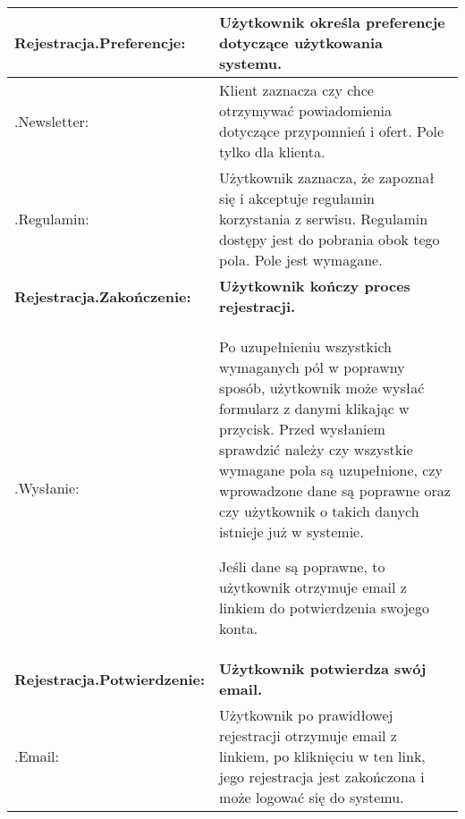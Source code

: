 \documentclass[a4paper,20pt]{article}
\begin{document}
\begin{itemize}
\begin{center}
\begin{tabularx}{\textwidth}[H]{XX}
\arrayrulecolor{black}\hline
\textbf{Rejestracja.Preferencje:} & \textbf{Użytkownik określa preferencje dotyczące użytkowania systemu.} \\
\hline

\quad .Newsletter: &
\begin{minipage}[t]{\linewidth}%
Klient zaznacza czy chce otrzymywać powiadomienia dotyczące przypomnień i ofert. Pole tylko dla klienta. 
\end{minipage}\\


\quad .Regulamin: &
\begin{minipage}[t]{\linewidth}%
Użytkownik zaznacza, że zapoznał się i akceptuje regulamin korzystania z serwisu. Regulamin dostępy jest do pobrania obok tego pola. Pole jest wymagane.
\end{minipage}\\

\arrayrulecolor{black}\hline
\textbf{Rejestracja.Zakończenie:} & \textbf{Użytkownik kończy proces rejestracji.} \\
\hline


\quad .Wysłanie: &
\begin{minipage}[t]{\linewidth}%
Po uzupełnieniu wszystkich wymaganych pól w poprawny sposób, użytkownik może wysłać formularz z danymi klikając w przycisk. Przed wysłaniem sprawdzić należy czy wszystkie wymagane pola są uzupełnione, czy wprowadzone dane są poprawne oraz czy użytkownik o takich danych istnieje już w systemie.

Jeśli dane są poprawne, to użytkownik otrzymuje email z linkiem do potwierdzenia swojego konta. 
\end{minipage}\\




\arrayrulecolor{black}\hline
\textbf{Rejestracja.Potwierdzenie:} & \textbf{Użytkownik potwierdza swój email.} \\
\hline


\quad .Email: &
\begin{minipage}[t]{\linewidth}%
Użytkownik po prawidłowej rejestracji otrzymuje email z linkiem, po kliknięciu w ten link, jego rejestracja jest zakończona i może logować się do systemu.
\end{minipage}\\


\end{tabularx}
\end{center}



\end{itemize}
\end{document}
